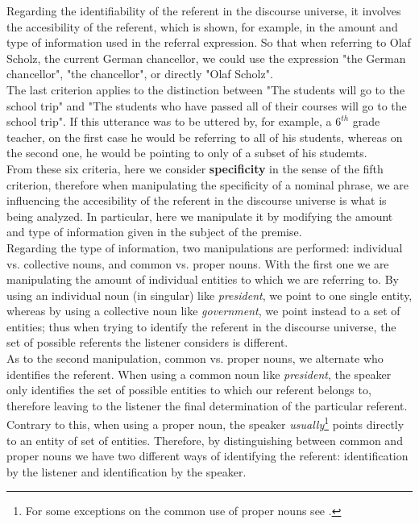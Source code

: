 Regarding the identifiability of the referent in the discourse universe, it involves the accesibility of the referent, which is shown, for example, in the amount and type of information used in the referral expression. So that when referring to Olaf Scholz, the current German chancellor, we could use the expression "the German chancellor", "the chancellor", or directly "Olaf Scholz".\\  
The last criterion applies to the distinction between "The students will go to the school trip" and "The students who have passed all of their courses will go to the school trip". If this utterance was to be uttered by, for example, a $6^{th}$ grade teacher, on the first case he would be referring to all of his students, whereas on the second one, he would be pointing to only of a subset of his studemts.\\ 

From these six criteria, here we consider \textbf{specificity} in the sense of the fifth criterion, therefore when manipulating the specificity of a nominal phrase, we are influencing the accesibility of the referent in the discourse universe is what is being analyzed. In particular, here we manipulate it by modifying the amount and type of information given in the subject of the premise.\\ 

Regarding the type of information, two manipulations are performed: individual vs. collective nouns, and common vs. proper nouns. With the first one we are manipulating the amount of individual entities to which we are referring to. By using an individual noun (in singular) like \textit{president}, we point to one single entity, whereas by using a collective noun like \textit{government}, we point instead to a set of entities; thus when trying to identify the referent in the discourse universe, the set of possible referents the listener considers is different.\\

As to the second manipulation, common vs. proper nouns, we alternate who identifies the referent. When using a common noun like \textit{president}, the speaker only identifies the set of possible entities to which our referent belongs to, therefore leaving to the listener the final determination of the particular referent. Contrary to this, when using a proper noun, the speaker \textit{usually}\footnote{For some exceptions on the common use of proper nouns see \citet{caudet1999expresiones}.} points directly to an entity of set of entities. Therefore, by distinguishing between common and proper nouns we have two different ways of identifying the referent: identification by the listener and identification by the speaker.\\

